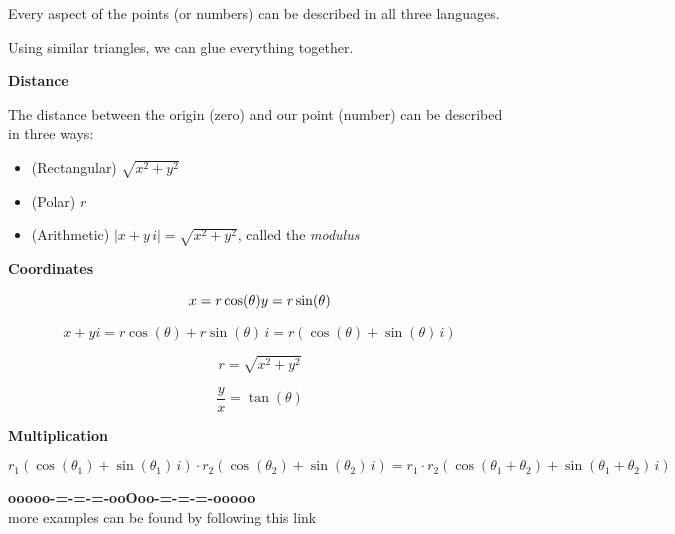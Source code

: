 \documentclass{ximera}
\begin{document}
Every aspect of the points (or numbers) can be described in all three languages.  


\qquad



Using similar triangles, we can glue everything together.  




\textbf{\textcolor{blue!55!black}{Distance}}  


The distance between the origin (zero) and our point (number) can be described in three ways:


\begin{itemize}
\item (Rectangular)  $\sqrt{x^2 + y^2}$
\item (Polar) $r$
\item (Arithmetic) $| x + y \, i  | = \sqrt{x^2 + y^2}$, called the \textit{modulus}
\end{itemize}



\qquad


\textbf{\textcolor{blue!55!black}{Coordinates}} 


\[
x = r \cos(\theta)  \\
y = r \sin(\theta)
\]


\[
x + y i = r \cos(\theta) + r \sin(\theta) \, i = r (\cos(\theta) +  \sin(\theta) \, i)
\]




\[
r = \sqrt{x^2 + y^2}
\]


\[
\frac{y}{x} = \tan(\theta)
\]





\qquad


\textbf{\textcolor{blue!55!black}{Multiplication}} 


\[
r_1 (\cos(\theta_1) +  \sin(\theta_1) \, i) \cdot r_2 (\cos(\theta_2) +  \sin(\theta_2) \, i) = r_1 \cdot r_2 (\cos(\theta_1 + \theta_2) +  \sin(\theta_1 + \theta_2) \, i) 
\]












\begin{center}
\textbf{\textcolor{green!50!black}{ooooo-=-=-=-ooOoo-=-=-=-ooooo}} \\

more examples can be found by following this link\\ 

\end{center}
\end{document}

